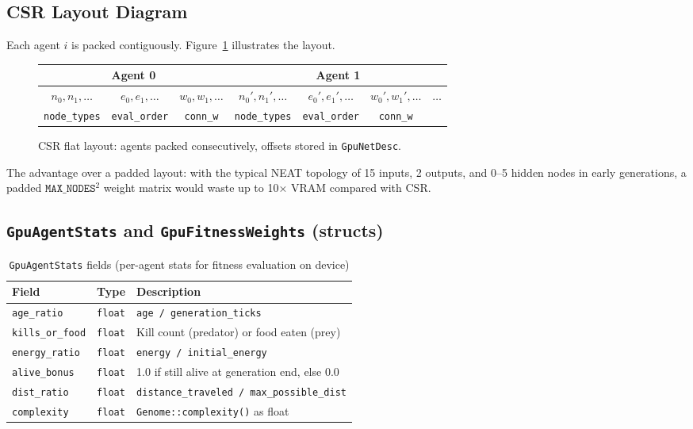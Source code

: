 \subsection{CSR Layout Diagram}

Each agent $i$ is packed contiguously.  Figure~\ref{fig:csr} illustrates the layout.

\begin{figure}[H]
\centering
\small
\begin{tabular}{|c|c|c|c|c|c|c|}
\hline
\multicolumn{3}{|c|}{Agent 0} & \multicolumn{4}{c|}{Agent 1} \\
\hline
$n_0, n_1, \ldots$ & $e_0, e_1, \ldots$ & $w_0, w_1, \ldots$
& $n_0', n_1', \ldots$ & $e_0', e_1', \ldots$ & $w_0', w_1', \ldots$ & $\ldots$ \\
\hline
\texttt{node\_types} & \texttt{eval\_order} & \texttt{conn\_w}
& \texttt{node\_types} & \texttt{eval\_order} & \texttt{conn\_w} & \\
\hline
\end{tabular}
\caption{CSR flat layout: agents packed consecutively, offsets stored in
\texttt{GpuNetDesc}.}
\label{fig:csr}
\end{figure}

The advantage over a padded layout: with the typical NEAT topology of 15 inputs, 2
outputs, and 0–5 hidden nodes in early generations, a padded
$\texttt{MAX\_NODES}^2$ weight matrix would waste up to 10× VRAM compared with CSR.

\subsection{\texttt{GpuAgentStats} and \texttt{GpuFitnessWeights} (structs)}

\begin{table}[H]
\centering\small
\caption{\texttt{GpuAgentStats} fields (per-agent stats for fitness evaluation on device)}
\begin{tabularx}{\textwidth}{@{}llX@{}}
\toprule
\textbf{Field} & \textbf{Type} & \textbf{Description} \\
\midrule
\texttt{age\_ratio}      & \texttt{float} & \texttt{age / generation\_ticks} \\
\texttt{kills\_or\_food} & \texttt{float} & Kill count (predator) or food eaten (prey) \\
\texttt{energy\_ratio}   & \texttt{float} & \texttt{energy / initial\_energy} \\
\texttt{alive\_bonus}    & \texttt{float} & 1.0 if still alive at generation end, else 0.0 \\
\texttt{dist\_ratio}     & \texttt{float} & \texttt{distance\_traveled / max\_possible\_dist} \\
\texttt{complexity}      & \texttt{float} & \texttt{Genome::complexity()} as float \\
\bottomrule
\end{tabularx}
\end{table}

